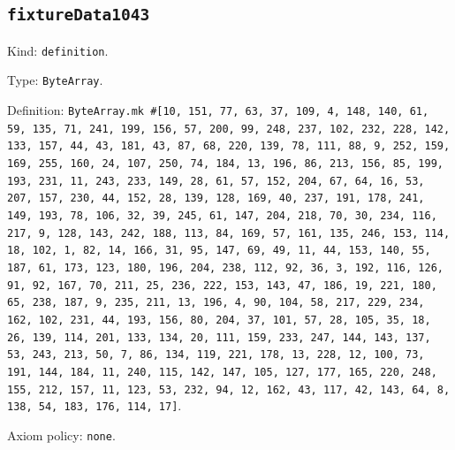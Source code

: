 \documentclass[11pt]{article}
\begin{document}
\subsection*{\texttt{fixtureData1043}}
\noindent Kind: \texttt{definition}.\par
\noindent Type: \texttt{ByteArray}.\par
\noindent Definition: \texttt{ByteArray.mk \#[10, 151, 77, 63, 37, 109, 4, 148, 140, 61, 59, 135, 71, 241, 199, 156, 57, 200, 99, 248, 237, 102, 232, 228, 142, 133, 157, 44, 43, 181, 43, 87, 68, 220, 139, 78, 111, 88, 9, 252, 159, 169, 255, 160, 24, 107, 250, 74, 184, 13, 196, 86, 213, 156, 85, 199, 193, 231, 11, 243, 233, 149, 28, 61, 57, 152, 204, 67, 64, 16, 53, 207, 157, 230, 44, 152, 28, 139, 128, 169, 40, 237, 191, 178, 241, 149, 193, 78, 106, 32, 39, 245, 61, 147, 204, 218, 70, 30, 234, 116, 217, 9, 128, 143, 242, 188, 113, 84, 169, 57, 161, 135, 246, 153, 114, 18, 102, 1, 82, 14, 166, 31, 95, 147, 69, 49, 11, 44, 153, 140, 55, 187, 61, 173, 123, 180, 196, 204, 238, 112, 92, 36, 3, 192, 116, 126, 91, 92, 167, 70, 211, 25, 236, 222, 153, 143, 47, 186, 19, 221, 180, 65, 238, 187, 9, 235, 211, 13, 196, 4, 90, 104, 58, 217, 229, 234, 162, 102, 231, 44, 193, 156, 80, 204, 37, 101, 57, 28, 105, 35, 18, 26, 139, 114, 201, 133, 134, 20, 111, 159, 233, 247, 144, 143, 137, 53, 243, 213, 50, 7, 86, 134, 119, 221, 178, 13, 228, 12, 100, 73, 191, 144, 184, 11, 240, 115, 142, 147, 105, 127, 177, 165, 220, 248, 155, 212, 157, 11, 123, 53, 232, 94, 12, 162, 43, 117, 42, 143, 64, 8, 138, 54, 183, 176, 114, 17]}.\par
\noindent Axiom policy: \texttt{none}.\par
\end{document}
